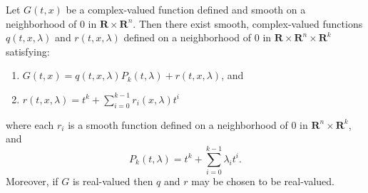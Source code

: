 Let $G(t, x)$ be a complex-valued function defined and smooth on a neighborhood of $0$ in $\mathbf{R} \times \mathbf{R}^n$. Then there exist smooth, complex-valued functions $q(t, x, \lambda)$ and $r(t, x, \lambda)$ defined on a neighborhood of $0$ in $\mathbf{R} \times \mathbf{R}^n \times \mathbf{R}^k$ satisfying:
\begin{enumerate}
\item $G(t, x) = q(t, x, \lambda) P_k(t, \lambda) + r(t, x, \lambda)$, and
\item $r(t, x, \lambda) = t^k + \sum_{i=0}^{k-1} r_i(x, \lambda) t^i$
\end{enumerate}
where each $r_i$ is a smooth function defined on a neighborhood of $0$ in $\mathbf{R}^n \times \mathbf{R}^k$, and
$$P_k(t, \lambda) = t^k + \sum_{i=0}^{k-1} \lambda_i t^i.$$
Moreover, if $G$ is real-valued then $q$ and $r$ may be chosen to be real-valued.